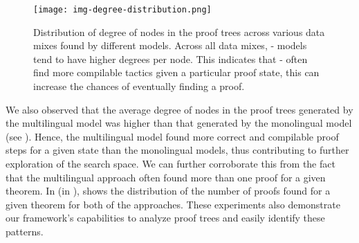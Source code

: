 \begin{figure*}[h]
\centering
\footnotesize
\texttt{[image: img-degree-distribution.png]}
\caption{Distribution of degree of nodes in the proof trees across various data mixes found by different \name\; models. Across all data mixes, \name-\multi\; models tend to have higher degrees per node. This indicates that \name-\multi\; often find more compilable tactics given a particular proof state, this can increase the chances of eventually finding a proof.}
\label{fig:high-degree}
\end{figure*}

We also observed that the average degree of nodes in the proof trees generated by the multilingual model was higher than that generated by the monolingual model (see ). Hence, the multilingual model found more correct and compilable proof steps for a given state than the monolingual models, thus contributing to further exploration of the search space. We can further corroborate this from the fact that the multilingual approach often found more than one proof for a given theorem. In  (in ), shows the distribution of the number of proofs found for a given theorem for both of the approaches. These experiments also demonstrate our framework's capabilities to analyze proof trees and easily identify these patterns.